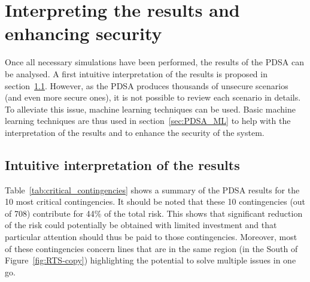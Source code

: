 

\section{Interpreting the results and enhancing security}
\label{sec:PDSA_interpretation}

Once all necessary simulations have been performed, the results of the PDSA can be analysed. A first intuitive interpretation of the results is proposed in section~\ref{sec:PDSA_results_intuitive}. However, as the PDSA produces thousands of unsecure scenarios (and even more secure ones), it is not possible to review each scenario in details. To alleviate this issue, machine learning techniques can be used. Basic machine learning techniques are thus used in section~\ref{sec:PDSA_ML} to help with the interpretation of the results and to enhance the security of the system.

\subsection{Intuitive interpretation of the results}
\label{sec:PDSA_results_intuitive}

Table~\ref{tab:critical_contingencies} shows a summary of the PDSA results for the 10 most critical contingencies. It should be noted that these 10 contingencies (out of 708) contribute for 44\% of the total risk. This shows that significant reduction of the risk could potentially be obtained with limited investment and that particular attention should thus be paid to those contingencies. Moreover, most of these contingencies concern lines that are in the same region (in the South of Figure~\ref{fig:RTS-copy}) highlighting the potential to solve multiple issues in one go.

